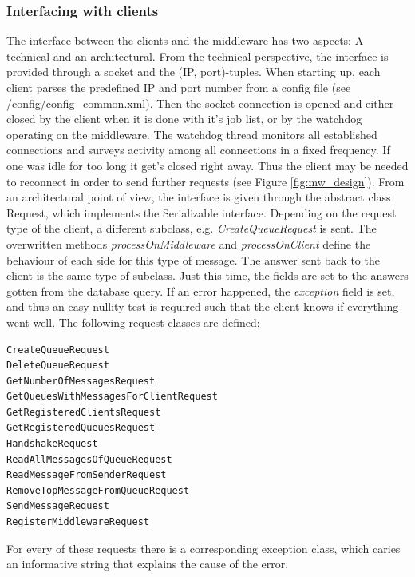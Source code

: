 \documentclass[11pt]{article}
\begin{document}
\subsubsection{Interfacing with clients}\label{sec:interfacing-with-clients}
The interface between the clients and the middleware has two aspects: A technical and an architectural. From the technical perspective, the interface is provided through a socket and the (IP, port)-tuples. When starting up, each client parses the predefined IP and port number from a config file (see /config/config\_common.xml). Then the socket connection is opened and either closed by the client when it is done with it's job list, or by the watchdog operating on the middleware. The watchdog thread monitors all established connections and surveys activity among all connections in a fixed frequency. If one was idle for too long it get's closed right away. Thus the client may be needed to reconnect in order to send further requests (see Figure \ref{fig:mw_design}). From an architectural point of view, the interface is given through the abstract class Request, which implements the Serializable interface. Depending on the request type of the client, a different subclass, e.g. \textit{CreateQueueRequest} is sent. The overwritten methods \textit{processOnMiddleware} and \textit{processOnClient} define the behaviour of each side for this type of message. The answer sent back to the client is the same type of subclass. Just this time, the fields are set to the answers gotten from the database query. If an error happened, the \textit{exception} field is set, and thus an easy nullity test is required such that the client knows if everything went well.
The following request classes are defined:
\begin{lstlisting}[basicstyle=\small]
CreateQueueRequest
DeleteQueueRequest
GetNumberOfMessagesRequest
GetQueuesWithMessagesForClientRequest
GetRegisteredClientsRequest
GetRegisteredQueuesRequest
HandshakeRequest
ReadAllMessagesOfQueueRequest
ReadMessageFromSenderRequest
RemoveTopMessageFromQueueRequest
SendMessageRequest
RegisterMiddlewareRequest
\end{lstlisting}
For every of these requests there is a corresponding exception class, which caries an informative string that explains the cause of the error.
\end{document}
